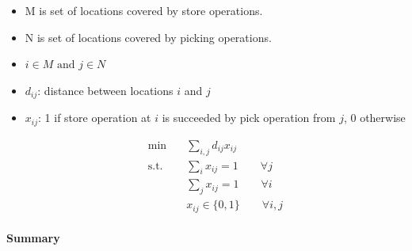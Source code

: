 \begin{itemize}
    \item M is set of locations covered by store operations.
    \item N is set of locations covered by picking operations.
    \item $i \in M \text{ and } j \in N$
    \item $d_{ij}$: distance between locations $i$ and $j$
    \item $x_{ij}$: 1 if store operation at $i$ is succeeded by
    pick operation from $j$, 0 otherwise

    \begin{align*}
    \min \quad & \sum_{i,j} d_{ij}x_{ij} \\[0.2cm]
    \text{s.t.} \quad
    & \sum_i x_{ij} = 1 \qquad \forall j \\[0.1cm]
    & \sum_j x_{ij} = 1 \qquad \forall i \\[0.1cm]
    & x_{ij} \in \{0,1\} \qquad \forall i,j
    \end{align*}  
    
\end{itemize}

\paragraph{Summary}


